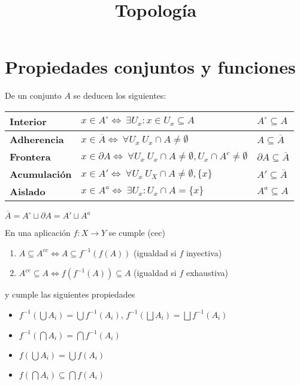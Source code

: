 \documentclass[leqno]{article}
\title{Topología}
\begin{document}
\maketitle
\tableofcontents
\newpage

\section{Propiedades conjuntos y funciones}

De un conjunto $A$ se deducen los siguientes:

\begin{tabular}{|l|l|l|}
  \hline
  \textbf{Interior} & $x \in  A^\circ \iff \ \exists U_x : x \in  U_x \subseteq A $ & $A^\circ \subseteq A$ \\
  \hline
  \textbf{Adherencia} & $x\in \overline{A} \iff \ \forall U_x \ U_x\cap A \neq \emptyset $ & $A \subseteq \overline{A}$ \\
  \hline
  \textbf{Frontera} & $x\in \partial A \iff \ \forall U_x \ U_x \cap A \neq \emptyset , U_x\cap A^c\neq \emptyset$ & $\partial A \subseteq \overline{A}$ \\
  \hline
  \textbf{Acumulación} & $x \in  A' \iff \ \forall U_x \ U_X\cap A \neq \emptyset, \{x\}$ & $A'\subseteq \overline{A}$ \\
  \hline
  \textbf{Aislado} & $x\in A^a \iff \ \exists U_x : U_x \cap A = \{x\}$ & $A^a \subseteq  A$ \\
  \hline
\end{tabular}

$\overline{A} = A^\circ \sqcup \partial A = A' \sqcup A^a $

En una aplicación $f:X\to Y$ se cumple (cec)
\begin{enumerate}[topsep=-6pt, itemsep=0pt]
  \item $A\subseteq A^{ec} \iff A\subseteq f^{-1}(f(A))$ (igualdad si $f$ inyectiva)
  \item $A^{ce}\subseteq A \iff f(f^{-1}(A))\subseteq A$ (igualdad si $f$ exhaustiva)
\end{enumerate}
y cumple las siguientes propiedades
\begin{itemize}[topsep=-6pt, itemsep=0pt]
  \item $f^{-1}(\bigcup A_i)=\bigcup f^{-1}(A_i)$, $f^{-1}(\bigsqcup A_i)=\bigsqcup f^{-1}(A_i)$
  \item $f^{-1}(\bigcap A_i) = \bigcap f^{-1}(A_i)$
  \item $f(\bigcup A_i)=\bigcup f(A_i)$ 
  \item $f(\bigcap A_i) \subseteq \bigcap f(A_i)$
\end{itemize}
\end{document}
